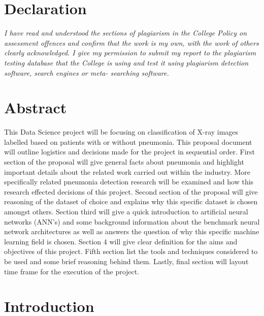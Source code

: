 \documentclass[12pt, twoside, a4paper]{article}
\begin{document}

\section*{Declaration}

\vfill
\textit{I have read and understood the sections of plagiarism in the College Policy on assessment offences and confirm that the work is my own, with the work of others clearly acknowledged. I give my permission to submit my report to the plagiarism testing database that the College is using and test it using plagiarism detection software, search engines or meta- searching software.}
\vfill

\clearpage

\section*{Abstract}
This Data Science project will be focusing on classification of X-ray images labelled based on patients with or without pneumonia. This proposal document will outline logistics and decisions made for the project in sequential order. First section of the proposal will give general facts about pneumonia and highlight important details about the related work carried out within the industry. More specifically related pneumonia detection research will be examined and how this research effected decisions of this project. Second section of the proposal will give reasoning of the dataset of choice and explains why this specific dataset is chosen amongst others. Section third will give a quick introduction to artificial neural networks (ANN's) and some background information about the benchmark neural network architectures as well as answers the question of why this specific machine learning field is chosen. Section 4 will give clear definition for the aims and objectives of this project. Fifth section list the tools and techniques considered to be used and some brief reasoning behind them. Lastly, final section will layout time frame for the execution of the project. 

\clearpage

\tableofcontents
\thispagestyle{empty}
\cleardoublepage
    

\setcounter{page}{1}


\section{Introduction}
\end{document}
